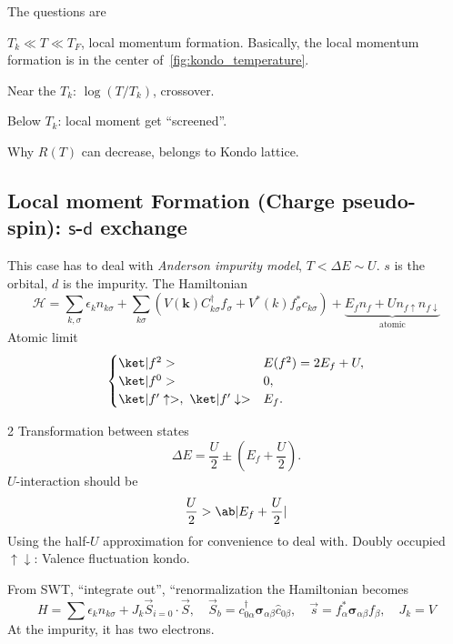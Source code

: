 The questions are
\begin{enumext}
  \item $T_k \ll T \ll T_F$, local momentum formation.
  Basically, the local momentum formation is in the center
  of~\ref{fig:kondo_temperature}.
  \item Near the $T_k$: $\log(T/T_k)$, crossover.
  \item Below $T_k$: local moment get ``screened''.
  \item Why $R(T)$ can decrease, belongs to Kondo lattice.
\end{enumext}

\subsection{Local moment Formation (Charge pseudo-spin):
  $\mathsf s$-$\mathsf d$ exchange}

This case has to deal with \emph{Anderson impurity model},
$T < \Delta E \sim U$.
$s$ is the orbital, $d$ is the impurity.
The Hamiltonian
\[
  \mathcal H = \sum_{k,\sigma} \epsilon_k n_{k\sigma}
    + \sum_{k\sigma}(V(\bm k) C_{k\sigma}^\dagger f_\sigma
    + V^*(k) f_\sigma^* c_{k\sigma})
    + \underbrace{E_f n_f + U n_{f\uparrow} n_{f\downarrow}}_
      \text{atomic}
\]
Atomic limit
\[
  \begin{cases}
    \ket|f^2> & E(f^2) = 2E_f + U,\\
    \ket|f^0> & 0,\\
    \ket|f'\uparrow>,\ \ket|f'\downarrow> &
    E_f.
  \end{cases}
\]
\begin{paracol}{2}
Transformation between states
\[
  \Delta E = \frac U2 \pm (E_f + \frac U2).
\]
$U$-interaction should be
\[
  \frac U2 > \ab|E_f + \frac U2|
\]
Using the half-$U$ approximation for convenience to deal with.
Doubly occupied $\uparrow\downarrow$: Valence fluctuation kondo.
\switchcolumn \centering
{}
\end{paracol}
From SWT, ``integrate out'', ``renormalization
the Hamiltonian becomes
\[
  H = \sum \epsilon_k n_{k\sigma} + J_k \vec S_{i=0} \cdot \vec S,\quad
  \vec S_b = c_{0\alpha}^\dagger \bm \sigma_{\alpha\beta} \hat c_{0\beta},
  \quad \vec s = f_\alpha^* \bm \sigma_{\alpha\beta} f_\beta, \quad J_k = V
\]
At the impurity, it has two electrons.

